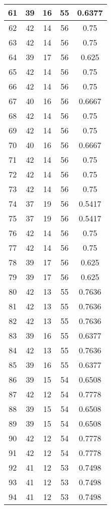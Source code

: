 \documentclass[letterpaper, 12pt]{article}
\begin{document}
\begin{longtable}{|c|c|c|c|c|}
\hline
61 & 39 & 16 & 55 & 0.6377 \\
\hline
62 & 42 & 14 & 56 & 0.75 \\
\hline
63 & 42 & 14 & 56 & 0.75 \\
\hline
64 & 39 & 17 & 56 & 0.625 \\
\hline
65 & 42 & 14 & 56 & 0.75 \\
\hline
66 & 42 & 14 & 56 & 0.75 \\
\hline
67 & 40 & 16 & 56 & 0.6667 \\
\hline
68 & 42 & 14 & 56 & 0.75 \\
\hline
69 & 42 & 14 & 56 & 0.75 \\
\hline
70 & 40 & 16 & 56 & 0.6667 \\
\hline
71 & 42 & 14 & 56 & 0.75 \\
\hline
72 & 42 & 14 & 56 & 0.75 \\
\hline
73 & 42 & 14 & 56 & 0.75 \\
\hline
74 & 37 & 19 & 56 & 0.5417 \\
\hline
75 & 37 & 19 & 56 & 0.5417 \\
\hline
76 & 42 & 14 & 56 & 0.75 \\
\hline
77 & 42 & 14 & 56 & 0.75 \\
\hline
78 & 39 & 17 & 56 & 0.625 \\
\hline
79 & 39 & 17 & 56 & 0.625 \\
\hline
80 & 42 & 13 & 55 & 0.7636 \\
\hline
81 & 42 & 13 & 55 & 0.7636 \\
\hline
82 & 42 & 13 & 55 & 0.7636 \\
\hline
83 & 39 & 16 & 55 & 0.6377 \\
\hline
84 & 42 & 13 & 55 & 0.7636 \\
\hline
85 & 39 & 16 & 55 & 0.6377 \\
\hline
86 & 39 & 15 & 54 & 0.6508 \\
\hline
87 & 42 & 12 & 54 & 0.7778 \\
\hline
88 & 39 & 15 & 54 & 0.6508 \\
\hline
89 & 39 & 15 & 54 & 0.6508 \\
\hline
90 & 42 & 12 & 54 & 0.7778 \\
\hline
91 & 42 & 12 & 54 & 0.7778 \\
\hline
92 & 41 & 12 & 53 & 0.7498 \\
\hline
93 & 41 & 12 & 53 & 0.7498 \\
\hline
94 & 41 & 12 & 53 & 0.7498 \\
\hline

\end{longtable}
\end{document}
